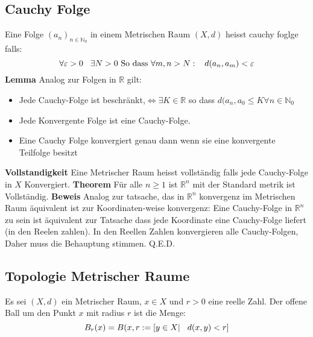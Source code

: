 \documentclass{article}
\newcommand{\mspc}{\hspace{0.3cm}}
\begin{document}
\subsection{Cauchy Folge}Eine Folge $(a_n)_{n\in\mathbb{N}_0}$ in einem Metrischen Raum $(X,d)$ heisst cauchy foglge falls:\[\forall \varepsilon >0 \mspc \exists N>0 \text{ So dass } \forall m,n >N: \mspc d(a_n,a_m)<\varepsilon\]
\textbf{Lemma} Analog zur Folgen in $\mathbb{R}$ gilt:
\begin{itemize}
\item{Jede Cauchy-Folge ist beschränkt,$\Leftrightarrow \exists K\in\mathbb{R}$ so dass $ d(a_n,a_0\le K \forall n\in \mathbb{N}_0$}
\item{Jede Konvergente Folge ist eine Cauchy-Folge.}
\item{Eine Cauchy Folge konvergiert genau dann wenn sie eine konvergente Teilfolge besitzt}
\end{itemize}
\textbf{Vollstandigkeit} Eine Metrischer Raum heisst vollständig falls jede Cauchy-Folge in $X$ Konvergiert.
\newline\textbf{Theorem} Für alle $n\ge1$ ist $\mathbb{R}^n$ mit der Standard metrik ist Vollständig.\newline
\textbf{Beweis} Analog zur tatsache, das in $\mathbb{R}^n$ konvergenz im Metrischen Raum äquivalent ist zur Koordinaten-weise konvergenz: Eine Cauchy-Folge in $\mathbb{R}^n$ zu sein ist äquivalent zur Tatsache dass jede Koordinate eine Cauchy-Folge liefert (in den Reelen zahlen).\newline
In den Reellen Zahlen konvergieren alle Cauchy-Folgen, Daher muss die Behauptung stimmen. Q.E.D.
\subsection{Topologie Metrischer Raume}
Es sei $(X,d)$ ein Metrischer Raum, $x\in X$ und $r>0$ eine reelle Zahl. Der offene Ball um den Punkt $x$ mit radius $r$ ist die Menge:\[B_r(x)=B(x,r:=\left[y\in X|\mspc d(x,y)<r\right]\]
\end{document}

